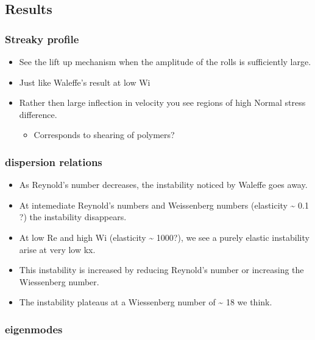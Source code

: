 \subsection{Results}\label{results}

\subsubsection{Streaky profile}\label{streaky-profile}

\begin{itemize}
\itemsep1pt\parskip0pt
\item
  See the lift up mechanism when the amplitude of the rolls is
  sufficiently large.
\item
  Just like Waleffe's result at low Wi
\item
  Rather then large inflection in velocity you see regions of high
  Normal stress difference.

  \begin{itemize}
  \itemsep1pt\parskip0pt
  \item
    Corresponds to shearing of polymers?
  \end{itemize}
\end{itemize}

\subsubsection{dispersion relations}\label{dispersion-relations}

\begin{itemize}
\itemsep1pt\parskip0pt
\item
  As Reynold's number decreases, the instability noticed by Waleffe goes
  away.
\item
  At intemediate Reynold's numbers and Weissenberg numbers (elasticity
  \textasciitilde{} 0.1 ?) the instability disappears.
\item
  At low Re and high Wi (elasticity \textasciitilde{} 1000?), we see a
  purely elastic instability arise at very low kx.
\item
  This instability is increased by reducing Reynold's number or
  increasing the Wiessenberg number.
\item
  The instability plateaus at a Wiessenberg number of \textasciitilde{}
  18 we think.
\end{itemize}

\subsubsection{eigenmodes}\label{eigenmodes}

